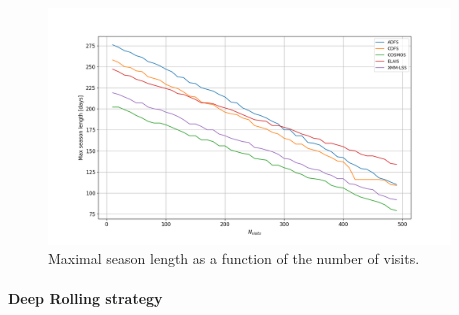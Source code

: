 \documentclass[skiphelvet,twocolumn]{lsstdescnote}
\begin{document}
\begin{figure}[htbp]
\begin{center}
  \includegraphics[width=0.95\textwidth]{seasonlength_nvisits.png}
 \caption{Maximal season length as a function of the number of visits.}\label{fig:seasonlength_nvisits}
\end{center}
\end{figure}

\paragraph{Deep Rolling strategy}
\end{document}
